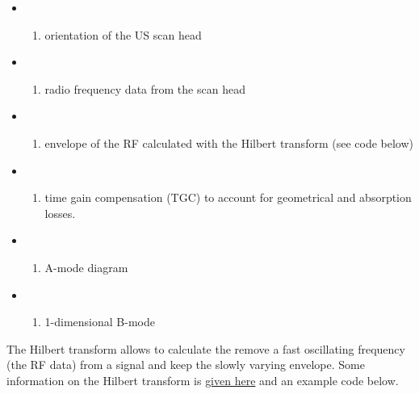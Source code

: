 \documentclass{article}
\providecommand{\tightlist}{%
      \setlength{\itemsep}{0pt}\setlength{\parskip}{0pt}}
\begin{document}
\begin{itemize}
\item
  \begin{enumerate}
  \def\labelenumi{(\alph{enumi})}
  \tightlist
  \item
    orientation of the US scan head
  \end{enumerate}
\item
  \begin{enumerate}
  \def\labelenumi{(\alph{enumi})}
  \setcounter{enumi}{1}
  \tightlist
  \item
    radio frequency data from the scan head
  \end{enumerate}
\item
  \begin{enumerate}
  \def\labelenumi{(\alph{enumi})}
  \setcounter{enumi}{2}
  \tightlist
  \item
    envelope of the RF calculated with the Hilbert transform (see code
    below)
  \end{enumerate}
\item
  \begin{enumerate}
  \def\labelenumi{(\alph{enumi})}
  \setcounter{enumi}{3}
  \tightlist
  \item
    time gain compensation (TGC) to account for geometrical and
    absorption losses.
  \end{enumerate}
\item
  \begin{enumerate}
  \def\labelenumi{(\alph{enumi})}
  \setcounter{enumi}{4}
  \tightlist
  \item
    A-mode diagram
  \end{enumerate}
\item
  \begin{enumerate}
  \def\labelenumi{(\alph{enumi})}
  \setcounter{enumi}{5}
  \tightlist
  \item
    1-dimensional B-mode
  \end{enumerate}
\end{itemize}

The Hilbert transform allows to calculate the remove a fast oscillating
frequency (the RF data) from a signal and keep the slowly varying
envelope. Some information on the Hilbert transform is
\href{http://complextoreal.com/wp-content/uploads/2013/01/tcomplex.pdf}{given
here} and an example code below.
\end{document}
